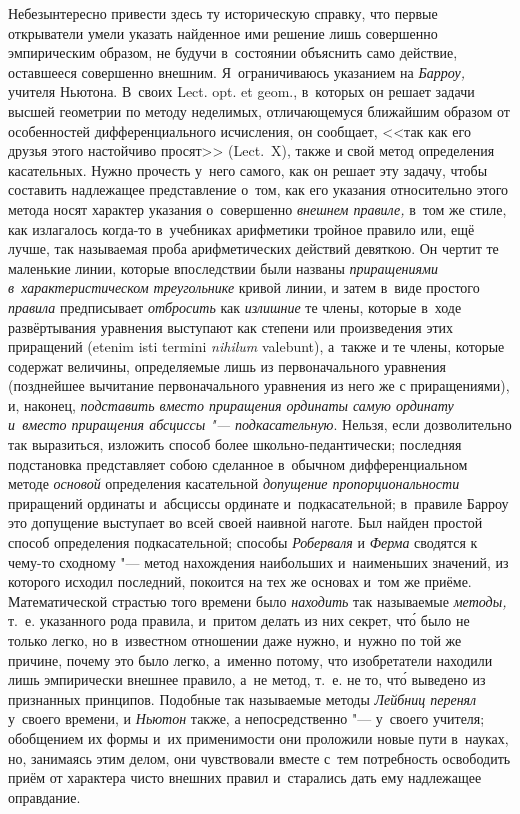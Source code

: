 Небезынтересно привести здесь ту историческую справку, что первые открыватели
умели указать найденное ими решение лишь совершенно эмпирическим образом, не
будучи в~состоянии объяснить само действие, оставшееся совершенно внешним.
Я~ограничиваюсь указанием на {\em Барроу,} учителя Ньютона. В~своих Lect. opt.
et geom., в~которых он решает задачи высшей геометрии по методу неделимых,
отличающемуся ближайшим образом от особенностей дифференциального исчисления,
он сообщает, <<так как его друзья этого настойчиво просят>> (Lect.~X), также и
свой метод определения касательных. Нужно прочесть у~него самого, как он решает
эту задачу, чтобы составить надлежащее представление о~том, как его указания
относительно этого метода носят характер указания о~совершенно {\em внешнем
правиле,} в~том же стиле, как излагалось когда-то в~учебниках арифметики
тройное правило или, ещё лучше, так называемая проба арифметических действий
девяткою. Он чертит те маленькие линии, которые впоследствии были
названы {\em приращениями в~характеристическом треугольнике} кривой линии, и
затем в~виде простого {\em правила} предписывает {\em отбросить} как
{\em излишние} те члены, которые в~ходе развёртывания уравнения выступают как
степени или произведения этих приращений (etenim isti termini {\em nihilum}
vale\-bunt), а~также
и те члены, которые содержат величины, определяемые лишь из первоначального
уравнения (позднейшее вычитание первоначального уравнения из него же с
приращениями), и, наконец, {\em подставить вместо приращения ординаты самую
ординату и~вместо приращения абсциссы "--- подкасательную}. Нельзя, если
дозволительно так выразиться, изложить способ более школьно-педантически;
последняя подстановка представляет собою сделанное в~обычном дифференциальном
методе {\em основой} определения касательной {\em допущение пропорциональности}
приращений ординаты и~абсциссы ординате и~подкасательной; в~правиле Барроу это
допущение выступает во всей своей наивной наготе. Был найден простой способ
определения подкасательной; способы {\em Роберваля} и {\em Ферма} сводятся к
чему-то сходному "--- метод нахождения наибольших и~наименьших значений, из
которого исходил последний, покоится на тех же основах и~том же приёме.
Математической страстью того времени было {\em находить} так называемые
{\em методы,} т.~е. указанного рода правила, и~притом делать из них секрет,
чт\'{о} было не только легко, но в~известном отношении даже нужно, и~нужно по
той же причине, почему это было легко, а~именно потому, что изобретатели
находили лишь эмпирически внешнее правило, а~не метод, т.~е. не то, чт\'{о}
выведено из признанных принципов. Подобные так называемые методы
{\em Лейбниц перенял} у~своего времени, и {\em Ньютон} также,
а непосредственно "--- у~своего учителя; обобщением их
формы и~их применимости они проложили новые пути в~науках, но, занимаясь этим
делом, они чувствовали вместе с~тем потребность освободить приём от характера
чисто внешних правил и~старались дать ему надлежащее оправдание.

